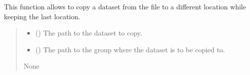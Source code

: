 \documentclass[letterpaper,10pt,english]{sphinxmanual}
\begin{document}
\begin{fulllineitems}
\begin{fulllineitems}
\end{fulllineitems}


\begin{fulllineitems}
\label{\detokenize{source/HDF5_BLS:HDF5_BLS.wrapper.Wrapper.copy_dataset}}
\pysigstartsignatures
\pysiglinewithargsret
{}
{\sphinxparamcomma {}}
{}
\pysigstopsignatures
\sphinxAtStartPar
This function allows to copy a dataset from the file to a different location while keeping the last location.
\begin{quote}\begin{description}
\begin{itemize}
\item {} 
\sphinxAtStartPar
{} () \textendash{} The path to the dataset to copy.

\item {} 
\sphinxAtStartPar
{} () \textendash{} The path to the group where the dataset is to be copied to.

\end{itemize}

\sphinxAtStartPar
None

\end{description}\end{quote}

\end{fulllineitems}



\end{fulllineitems}
\end{document}
